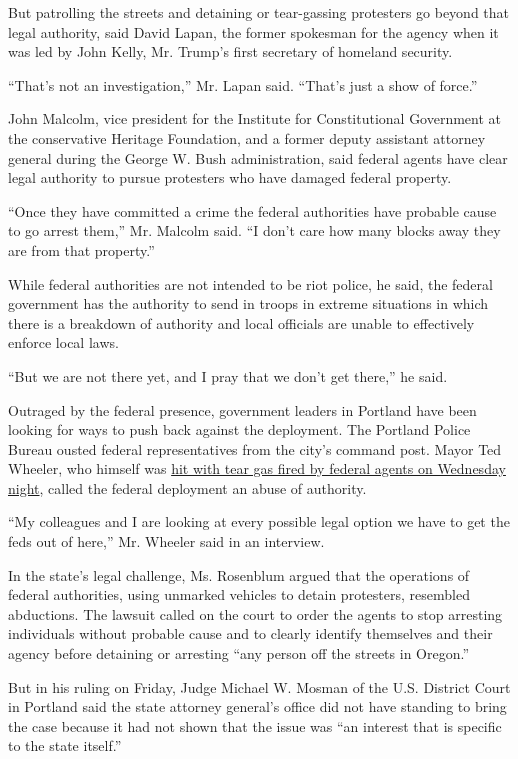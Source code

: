 But patrolling the streets and detaining or tear-gassing protesters go
beyond that legal authority, said David Lapan, the former spokesman for
the agency when it was led by John Kelly, Mr. Trump's first secretary of
homeland security.

``That's not an investigation,'' Mr. Lapan said. ``That's just a show of
force.''

John Malcolm, vice president for the Institute for Constitutional
Government at the conservative Heritage Foundation, and a former deputy
assistant attorney general during the George W. Bush administration,
said federal agents have clear legal authority to pursue protesters who
have damaged federal property.

``Once they have committed a crime the federal authorities have probable
cause to go arrest them,'' Mr. Malcolm said. ``I don't care how many
blocks away they are from that property.''

While federal authorities are not intended to be riot police, he said,
the federal government has the authority to send in troops in extreme
situations in which there is a breakdown of authority and local
officials are unable to effectively enforce local laws.

``But we are not there yet, and I pray that we don't get there,'' he
said.

Outraged by the federal presence, government leaders in Portland have
been looking for ways to push back against the deployment. The Portland
Police Bureau ousted federal representatives from the city's command
post. Mayor Ted Wheeler, who himself was
\href{https://www.nytimes.com/2020/07/23/us/portland-protest-tear-gas-mayor.html}{hit
with tear gas fired by federal agents on Wednesday night}, called the
federal deployment an abuse of authority.

``My colleagues and I are looking at every possible legal option we have
to get the feds out of here,'' Mr. Wheeler said in an interview.

In the state's legal challenge, Ms. Rosenblum argued that the operations
of federal authorities, using unmarked vehicles to detain protesters,
resembled abductions. The lawsuit called on the court to order the
agents to stop arresting individuals without probable cause and to
clearly identify themselves and their agency before detaining or
arresting ``any person off the streets in Oregon.''

But in his ruling on Friday, Judge Michael W. Mosman of the U.S.
District Court in Portland said the state attorney general's office did
not have standing to bring the case because it had not shown that the
issue was ``an interest that is specific to the state itself.''

